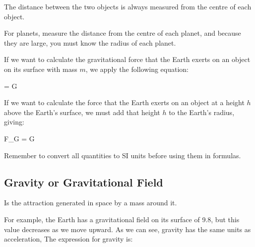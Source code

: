 \begin{remark}
    The distance between the two objects is always measured from the centre of each object.
\end{remark}

\begin{remark}
    For planets, measure the distance from the centre of each planet, and because they are large, you must know the radius of each planet.
\end{remark}

If we want to calculate the gravitational force that the Earth exerts on an object on its surface with mass \( m \), we apply the following equation:
\vspace*{31pt}
\begin{centeredequation}
    =
    G \cdot
\end{centeredequation}

\vspace*{31pt}

If we want to calculate the force that the Earth exerts on an object at a height \( h \) above the Earth's surface, we must add that height \( h \) to the Earth's radius, giving:
\begin{centeredequation}
    F_G = G \cdot {}
\end{centeredequation}

\begin{remark}
    Remember to convert all quantities to SI units before using them in formulas.
\end{remark}

\subsection{Gravity or Gravitational Field}
\begin{definition}
Is the attraction generated in space by a mass around it.
\end{definition}

For example, the Earth has a gravitational field on its surface of \qty{9.8}{\mpss}, but this value decreases as we move upward.
As we can see, gravity has the same units as acceleration,\unit{\mpss}
The expression for gravity is:

